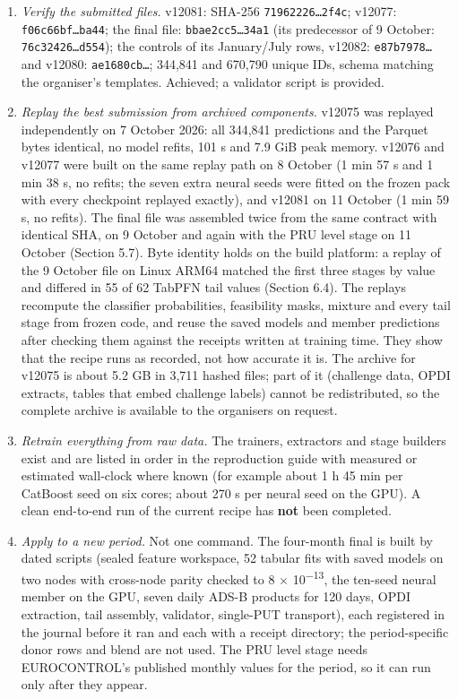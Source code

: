 \documentclass[
  manuscript=article,  %
  layout=preprint,     %
  year=2026,
  volume=4,
]{extra/joas}
\providecommand{\tightlist}{\setlength{\itemsep}{0pt}\setlength{\parskip}{0pt}}
\begin{document}
\begin{enumerate}
\def\labelenumi{\arabic{enumi}.}
\tightlist
\item
  \emph{Verify the submitted files.} v12081: SHA-256 \texttt{71962226\ldots{}2f4c}; v12077: \texttt{f06c66bf\ldots{}ba44}; the final file: \texttt{bbae2cc5\ldots{}34a1} (its predecessor of 9 October: \texttt{76c32426\ldots{}d554}); the controls of its January/July rows, v12082: \texttt{e87b7978\ldots{}} and v12080: \texttt{ae1680cb\ldots{}}; 344,841 and 670,790 unique IDs, schema matching the organiser's templates. Achieved; a validator script is provided.
\item
  \emph{Replay the best submission from archived components.} v12075 was replayed independently on 7 October 2026: all 344,841 predictions and the Parquet bytes identical, no model refits, 101 s and 7.9 GiB peak memory. v12076 and v12077 were built on the same replay path on 8 October (1 min 57 s and 1 min 38 s, no refits; the seven extra neural seeds were fitted on the frozen pack with every checkpoint replayed exactly), and v12081 on 11 October (1 min 59 s, no refits). The final file was assembled twice from the same contract with identical SHA, on 9 October and again with the PRU level stage on 11 October (Section 5.7). Byte identity holds on the build platform: a replay of the 9 October file on Linux ARM64 matched the first three stages by value and differed in 55 of 62 TabPFN tail values (Section 6.4). The replays recompute the classifier probabilities, feasibility masks, mixture and every tail stage from frozen code, and reuse the saved models and member predictions after checking them against the receipts written at training time. They show that the recipe runs as recorded, not how accurate it is. The archive for v12075 is about 5.2 GB in 3,711 hashed files; part of it (challenge data, OPDI extracts, tables that embed challenge labels) cannot be redistributed, so the complete archive is available to the organisers on request.
\item
  \emph{Retrain everything from raw data.} The trainers, extractors and stage builders exist and are listed in order in the reproduction guide with measured or estimated wall-clock where known (for example about 1 h 45 min per CatBoost seed on six cores; about 270 s per neural seed on the GPU). A clean end-to-end run of the current recipe has \textbf{not} been completed.
\item
  \emph{Apply to a new period.} Not one command. The four-month final is built by dated scripts (sealed feature workspace, 52 tabular fits with saved models on two nodes with cross-node parity checked to 8 $\times$ 10\textsuperscript{$-$13}, the ten-seed neural member on the GPU, seven daily ADS-B products for 120 days, OPDI extraction, tail assembly, validator, single-PUT transport), each registered in the journal before it ran and each with a receipt directory; the period-specific donor rows and blend are not used. The PRU level stage needs EUROCONTROL's published monthly values for the period, so it can run only after they appear.
\end{enumerate}
\end{document}
